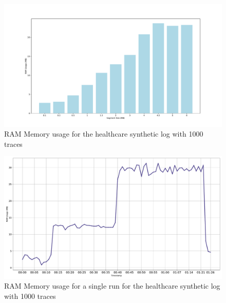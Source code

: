 \begin{figure}[t]
\centering
\includegraphics[width=1\linewidth]{content/figures/barplot_segsize.pdf}
\caption{RAM Memory usage for the healthcare synthetic log with 1000 traces}
\label{fig:barplot_segsize}
\end{figure}


\begin{figure}[t]
\centering
\includegraphics[width=1\linewidth]{content/figures/ram_usage_per_TS.pdf}
\caption{RAM Memory usage for a single run for the healthcare synthetic log with 1000 traces}
\label{fig:ramusage_ts}
\end{figure}


